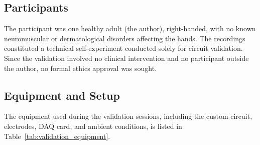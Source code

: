 \subsection{Participants}
The participant was one healthy adult (the author), right-handed, with no known neuromuscular or dermatological disorders affecting the hands. The recordings constituted a technical self-experiment conducted solely for circuit validation. Since the validation involved no clinical intervention and no participant outside the author, no formal ethics approval was sought.

\subsection{Equipment and Setup}
The equipment used during the validation sessions, including the custom circuit, electrodes, DAQ card, and ambient conditions, is listed in Table~\ref{tab:validation_equipment}.

